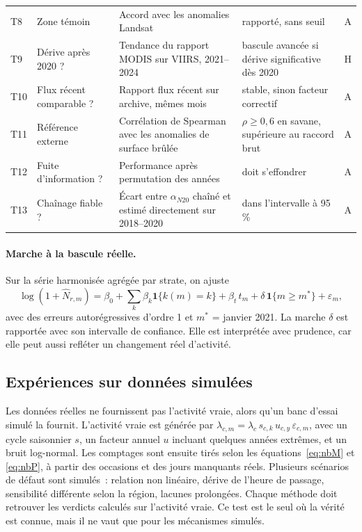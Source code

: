 \documentclass[11pt,a4paper]{article}
\begin{document}
\begin{longtable}{>{\raggedright\arraybackslash}p{0.8cm} >{\raggedright\arraybackslash}p{2.8cm} >{\raggedright\arraybackslash}p{5.2cm} >{\raggedright\arraybackslash}p{3.8cm} c}
\small T8 & \small Zone témoin & \small Accord avec les anomalies Landsat & \small rapporté, sans seuil & A \\
\small T9 & \small Dérive après 2020 ? & \small Tendance du rapport MODIS sur VIIRS, 2021--2024 & \small bascule avancée si dérive significative dès 2020 & H \\
\small T10 & \small Flux récent comparable ? & \small Rapport flux récent sur archive, mêmes mois & \small stable, sinon facteur correctif & A \\
\small T11 & \small Référence externe & \small Corrélation de Spearman avec les anomalies de surface brûlée & \small $\rho \ge 0{,}6$ en savane, supérieure au raccord brut & A \\
\small T12 & \small Fuite d'information ? & \small Performance après permutation des années & \small doit s'effondrer & A \\
\small T13 & \small Chaînage fiable ? & \small Écart entre $\alpha_{N20}$ chaîné et estimé directement sur 2018--2020 & \small dans l'intervalle à 95\,\% & A \\
\bottomrule
\end{longtable}

\paragraph{Marche à la bascule réelle.} Sur la série harmonisée agrégée par strate, on ajuste
\begin{equation}
  \log(1 + \hat N_{r,m}) = \beta_0 + \sum_k \beta_k \mathbf{1}\{k(m) = k\} + \beta_t\, t_m + \delta\, \mathbf{1}\{m \ge m^\ast\} + \varepsilon_m,
\end{equation}
avec des erreurs autorégressives d'ordre 1 et $m^\ast$ = janvier 2021. La marche $\delta$ est rapportée avec son intervalle de confiance. Elle est interprétée avec prudence, car elle peut aussi refléter un changement réel d'activité.

\subsection{Expériences sur données simulées}

Les données réelles ne fournissent pas l'activité vraie, alors qu'un banc d'essai simulé la fournit. L'activité vraie est générée par $\lambda_{c,m} = \lambda_c\, s_{c,k}\, u_{c,y}\, \varepsilon_{c,m}$, avec un cycle saisonnier $s$, un facteur annuel $u$ incluant quelques années extrêmes, et un bruit log-normal. Les comptages sont ensuite tirés selon les équations~\eqref{eq:nbM} et \eqref{eq:nbP}, à partir des occasions et des jours manquants réels. Plusieurs scénarios de défaut sont simulés~: relation non linéaire, dérive de l'heure de passage, sensibilité différente selon la région, lacunes prolongées. Chaque méthode doit retrouver les verdicts calculés sur l'activité vraie. Ce test est le seul où la vérité est connue, mais il ne vaut que pour les mécanismes simulés.
\end{document}
